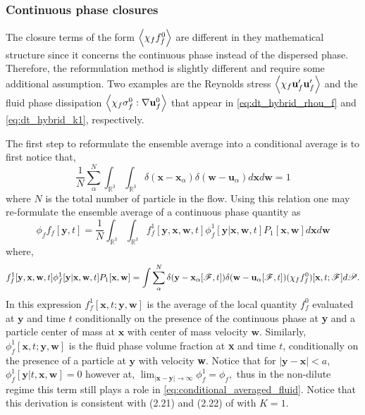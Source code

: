 \subsubsection{Continuous phase closures}

The closure terms of the form $\left<\chi_f f_f^0\right>$ are different in they mathematical structure since it concerns the continuous phase instead of the dispersed phase. 
Therefore, the reformulation method is slightly different and require some additional assumption. 
Two examples are the Reynolds stress $\left<\chi_f \textbf{u}_f'\textbf{u}_f'\right>$ and the fluid phase dissipation $\left<\chi_f\sigma_f^0:\mathbf{\nabla} \textbf{u}_f^0\right>$ that appear in \ref{eq:dt_hybrid_rhou_f} and \ref{eq:dt_hybrid_k1}, respectively.  

The first step to reformulate the ensemble average into a conditional average is to first notice that, 
\begin{equation}
    \frac{1}{N}\sum_\alpha^N
    \int_{\mathbb{R}^3}
    \int_{\mathbb{R}^3}
    \delta(\textbf{x}-\textbf{x}_\alpha)
    \delta(\textbf{w}-\textbf{u}_\alpha)
    d\textbf{x}
    d\textbf{w}
    = 1
\end{equation}
where $N$ is the total number of particle in the flow. 
Using this relation one may re-formulate the ensemble average of a continuous phase quantity as 
\begin{equation}
    \phi_f f_f[\textbf{y},t]
    = 
    \frac{1}{N}
    \int_{\mathbb{R}^3}
    \int_{\mathbb{R}^3}
    f_f^1[\textbf{y},\textbf{x},\textbf{w},t] \phi_f^1[\textbf{y}|\textbf{x},\textbf{w},t]  P_1[\textbf{x},\textbf{w}] 
    d\textbf{x} 
    d\textbf{w}
    \label{eq:conditional_averaged_fluid}
\end{equation}
where,
\begin{equation*}
    f_f^1[\textbf{y},\textbf{x},\textbf{w},t] \phi_f^1[\textbf{y}|\textbf{x},\textbf{w},t]  P_1[\textbf{x},\textbf{w}]
    =     
    \int
    \sum_\alpha^N 
    \delta(\textbf{y}-\textbf{x}_\alpha[\mathscr{F},t])
     \delta(\textbf{w}-\textbf{u}_\alpha[\mathscr{F},t])
    (\chi_f
    f^0_f)[\textbf{x},t;\mathscr{F}]
    d\mathscr{P}.
\end{equation*}
In this expression $f_f^1[\textbf{x},t;\textbf{y},\textbf{w}]$ is the average of the local quantity $f_f^0$ evaluated at $\textbf{y}$ and time $t$ conditionally on the presence of the continuous phase at \textbf{y} and a particle center of mass at $\textbf{x}$ with center of mass velocity $\textbf{w}$. 
Similarly, $\phi_f^1[\textbf{x},t;\textbf{y},\textbf{w}]$ is the fluid phase volume fraction at \textbf{x} and time $t$, conditionally on the presence of a particle at $\textbf{y}$ with velocity \textbf{w}. 
Notice that for $|\textbf{y}- \textbf{x}| < a$, $\phi_f^1[\textbf{y}|t,\textbf{x},\textbf{w}] = 0$ however at, 
$
    \lim_{|\textbf{x} - \textbf{y}| \to \infty} \phi_f^1 = \phi_f,
$
thus in the non-dilute regime this term still plays a role in \ref{eq:conditional_averaged_fluid}. 
Notice that this derivation is consistent with (2.21) and (2.22) of \citet{zhang1994ensemble} with $K = 1$. 

